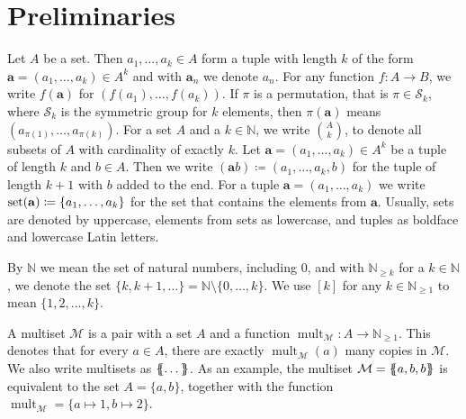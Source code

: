 \section{Preliminaries}
\label{sec:Preliminaries}

Let $A$ be a set.
Then $a_1,\dots, a_k\in A$ form a tuple with length $k$ of the form $\mathbf a=(a_1,\dots,a_k)\in A^k$ and with $\mathbf a_n$ we denote $a_n$.
For any function $f:A\to B$, we write $f(\mathbf a)$ for $(f(a_1),\dots,f(a_k))$.
If $\pi$ is a permutation, that is $\pi\in \mathcal S_k$, where $\mathcal S_k$ is the symmetric group for $k$ elements, then $\pi(\mathbf a)$ means $(a_{\pi(1)},\dots,a_{\pi(k)})$.
For a set $A$ and a $k\in \mathbb N$, we write $\binom{A}{k}$, to denote all subsets of $A$ with cardinality of exactly $k$.
Let $\mathbf a=(a_1,\dots,a_k)\in A^k$ be a tuple of length $k$ and $b\in A$.
Then we write $(\mathbf ab)\coloneqq(a_1,\dots,a_k,b)$ for the tuple of length $k+1$ with $b$ added to the end.
For a tuple $\mathbf a=(a_1,\dots,a_k)$ we write $\operatorname{set}(\mathbf a)\coloneqq\{a_1,\dots,a_k\}$ for the set that contains the elements from $\mathbf a$.
Usually, sets are denoted by uppercase, elements from sets as lowercase, and tuples as boldface and lowercase Latin letters.

By $\mathbb N$ we mean the set of natural numbers, including $0$, and with $\mathbb N_{\geq k}$ for a $k\in \mathbb N$, we denote the set $\{k,k+1,\dots\}=\mathbb N \setminus \{0,\dots,k\}$.
We use $[k]$ for any $k\in \mathbb N_{\geq 1}$ to mean $\{1,2,\dots, k\}$.

A multiset $\mathcal M$ is a pair with a set $A$ and a function $\operatorname{mult}_{\mathcal M}:A\to \mathbb N_{\geq 1}$.
This denotes that for every $a\in A$, there are exactly $\operatorname{mult}_{\mathcal M}(a)$ many copies in $\mathcal M$.
We also write multisets as $\left\{\kern-.35em\left\{\dots\right\}\kern-.35em\right\}$.
As an example, the multiset $\mathcal M = \left\{\kern-.35em\left\{a, b, b\right\}\kern-.35em\right\}$ is equivalent to the set $A=\{a,b\}$, together with the function $\operatorname{mult}_{\mathcal M}=\{a\mapsto 1, b\mapsto 2\}$.

